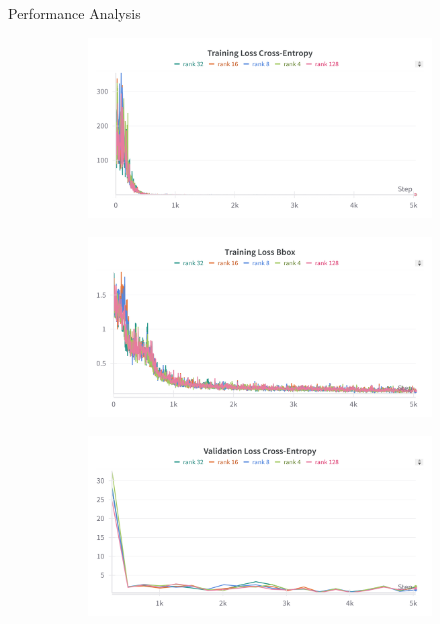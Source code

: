 \begin{subsectionframemod}{Performance Analysis}

\begin{figure}[h]
        \centering
        \begin{subfigure}{0.45\textwidth}
            \includegraphics[width=\textwidth]{Figures/lora_rank1.png}
        \end{subfigure}
        \begin{subfigure}{0.45\textwidth}
            \includegraphics[width=\textwidth]{Figures/lora_rank2.png}
        \end{subfigure}
        \begin{subfigure}{0.45\textwidth}
            \includegraphics[width=\textwidth]{Figures/lora_rank3.png}

\end{subfigure}
\end{figure}
\end{subsectionframemod}

